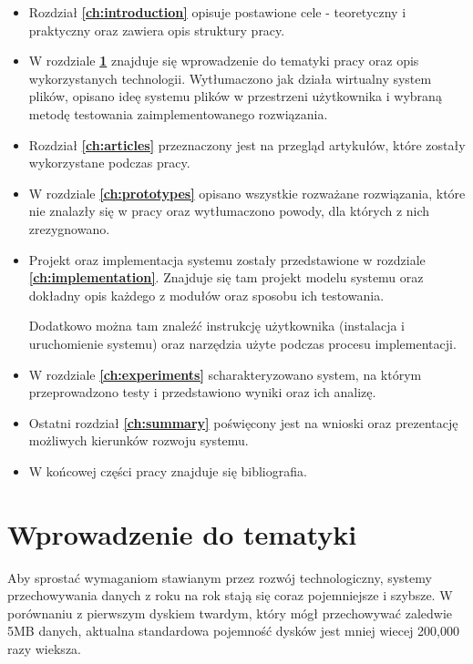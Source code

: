 \begin{itemize}
  \item Rozdział \textbf{\ref{ch:introduction}}
	opisuje postawione cele - teoretyczny i praktyczny oraz zawiera opis struktury pracy.

	\item W rozdziale \textbf{\ref{ch:subject-introduction}} znajduje się
	wprowadzenie do tematyki pracy oraz opis wykorzystanych technologii. 
	Wytłumaczono jak działa wirtualny system plików, opisano
    ideę systemu plików w przestrzeni użytkownika i wybraną metodę
    testowania zaimplementowanego rozwiązania.

	\item Rozdział \textbf{\ref{ch:articles}} przeznaczony jest na przegląd
    artykułów, które zostały wykorzystane podczas pracy.
    
    \item W rozdziale \textbf{\ref{ch:prototypes}} opisano wszystkie rozważane rozwiązania,
    które nie znalazły się w pracy oraz wytłumaczono powody, dla których
    z nich zrezygnowano.
    
    \item Projekt oraz implementacja systemu zostały przedstawione w rozdziale \textbf{\ref{ch:implementation}}.
    Znajduje się tam projekt modelu systemu oraz dokładny opis każdego
    z modułów oraz sposobu ich testowania.
    
    Dodatkowo można tam znaleźć instrukcję użytkownika (instalacja i uruchomienie systemu)
    oraz narzędzia użyte podczas procesu implementacji.
    
    \item W rozdziale \textbf{\ref{ch:experiments}} scharakteryzowano
    system, na którym przeprowadzono testy i przedstawiono wyniki
    oraz ich analizę.
    
    \item Ostatni rozdział \textbf{\ref{ch:summary}} poświęcony jest na
	wnioski oraz prezentację możliwych kierunków rozwoju systemu.
    
    \item W końcowej części pracy znajduje się bibliografia.
\end{itemize}

\chapter{Wprowadzenie do tematyki} \label{ch:subject-introduction}

Aby sprostać wymaganiom stawianym przez rozwój technologiczny, systemy przechowywania
danych z roku na rok stają się coraz pojemniejsze i szybsze. W porównaniu z pierwszym dyskiem twardym, który mógł przechowywać zaledwie 5MB danych, aktualna standardowa pojemność dysków jest
mniej wiecej 200,000 razy wieksza.

